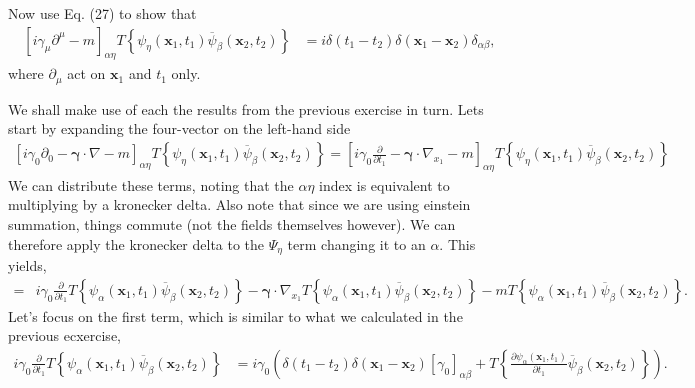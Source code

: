 \documentclass[working, oneside]{../../../Preambles/tuftebook}
\begin{document}
\begin{exercise}[4]
Now use Eq. (27) to show that
\begin{align*}
\left[ i \gamma_\mu \partial^\mu - m \right]_{\alpha \eta} T \left\{ \psi_\eta(\mathbf{x}_1, t_1) \overline{\psi}_\beta(\mathbf{x}_2, t_2) \right\}
&= i \delta(t_1 - t_2) \delta(\mathbf{x}_1 - \mathbf{x}_2) \delta_{\alpha \beta}, \tag{31}
\end{align*}
where \( \partial_\mu \) act on \( \mathbf{x}_1 \) and \( t_1 \) only.
\end{exercise}
\begin{solution}
We shall make use of each the results from the previous exercise in turn. Lets start by expanding the four-vector on the left-hand side
\begin{align*}
\left[ i \gamma_0\partial_0 - \mathbf{\gamma}\cdot \nabla - m \right]_{\alpha \eta} T \left\{ \psi_\eta(\mathbf{x}_1, t_1) \overline{\psi}_\beta(\mathbf{x}_2, t_2) \right\}
=
\left[ i \gamma_0 \frac{\partial}{\partial t_1}- \mathbf{\gamma}\cdot \nabla_{x_1} - m \right]_{\alpha \eta} T \left\{ \psi_\eta(\mathbf{x}_1, t_1) \overline{\psi}_\beta(\mathbf{x}_2, t_2) \right\}
\end{align*}
We can distribute these terms, noting that the $\alpha \eta$ index is equivalent to multiplying by a kronecker delta. Also note that since we are using einstein summation, things commute (not the fields themselves however). We can therefore apply the kronecker delta to the $\Psi_{\eta }$ term changing it to an $\alpha$. This yields,
\begin{align*}
    =& i \gamma_0 \frac{\partial}{\partial t_1}T \left\{ \psi_{\alpha}(\mathbf{x}_1, t_1) \overline{\psi}_\beta(\mathbf{x}_2, t_2) \right\} 
    - \mathbf{\gamma}\cdot \nabla _{x_1}T \left\{ \psi_{\alpha}(\mathbf{x}_1, t_1) \overline{\psi}_\beta(\mathbf{x}_2, t_2) \right\}
    -m T \left\{ \psi_{\alpha}(\mathbf{x}_1, t_1) \overline{\psi}_\beta(\mathbf{x}_2, t_2) \right\}
.\end{align*}
Let's focus on the first term, which is similar to what we calculated in the previous ecxercise,
\begin{align*}
     i \gamma_0 \frac{\partial}{\partial t_1}T \left\{ \psi_{\alpha}(\mathbf{x}_1, t_1) \overline{\psi}_\beta(\mathbf{x}_2, t_2) \right\} 
&= i \gamma_0 \left(    \delta(t_1 - t_2) \delta(\mathbf{x}_1 - \mathbf{x}_2) [\gamma_0]_{\alpha \beta} + T \left\{ \frac{\partial \psi_\alpha(\mathbf{x}_1, t_1)}{\partial t_1} \overline{\psi}_\beta(\mathbf{x}_2, t_2) \right\} \right)
.\end{align*}

\end{solution}
\end{document}
